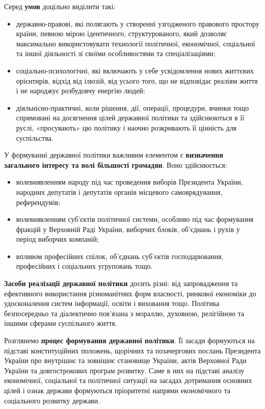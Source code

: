 Серед \textbf{умов} доцільно виділити такі:
\begin{itemize}
\item державно-правові, які полягають у створенні узгодженого правового простору країни, певною мірою ідентичного, структурованого, який дозволяє максимально використовувати технології політичної, економічної, соціальної та іншої діяльності зі своїми особливостями та спеціалізаціями;
\item соціально-психологічні, які включають у себе усвідомлення нових життєвих орієнтирів, відхід від ілюзій, від усього того, що не відповідає реаліям життя і не народжує розбудовчу енергію людей;
\item діяльнісно-практичні, коли рішення, дії, операції, процедури, вчинки тощо спрямовані на досягнення цілей державної політики та здійснюються в її руслі, «просувають» цю політику і наочно розкривають її цінність для суспільства.
\end{itemize}
У формуванні державної політики важливим елементом є \textbf{визначення загального інтересу та волі більшості громадян}. Воно здійснюється:
\begin{itemize}
\item волевиявленням народу під час проведення виборів Президента України, народних депутатів і депутатів органів місцевого самоврядування, референдумів;
\item волевиявленням суб’єктів політичної системи, особливо під час формування фракцій у Верховній Раді України, виборчих блоків, об’єднань і рухів у період виборчих компаній;
\item впливом професійних спілок, об’єднань суб’єктів господарювання, професійних і соціальних угруповань тощо.
\end{itemize}
\textbf{Засоби реалізації державної політики} досить різні: від запровадження та ефективного використання різноманітних форм власності, ринкової економіки до удосконалення систем інформації, освіти і виховання тощо. Політика безпосередньо та діалектично пов’язана з мораллю, духовною, релігійною та іншими сферами суспільного життя.

Розглянемо \textbf{процес формування державної політики}. Її засади формуються на підставі конституційних положень, щорічних та позачергових послань Президента України про внутрішнє та зовнішнє становище України, актів Верховної Ради України та довгострокових програм розвитку. Саме в них на підставі аналізу економічної, соціальної та політичної ситуації на засадах дотримання основних цілей і ознак держави формуються пріоритетні напрями економічного та соціального розвитку держави.

